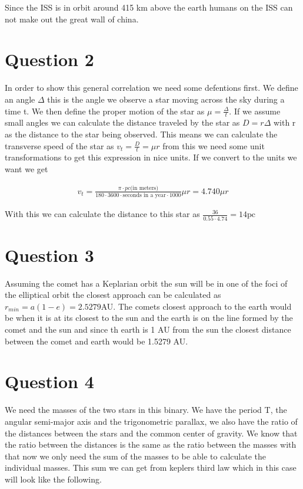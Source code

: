 \documentclass[a4paper]{article}
\begin{document}
Since the ISS is in orbit around 415 km above the earth humans on the ISS can not make out the great wall of china.

\section*{Question 2}

In order to show this general correlation we need some defentions first. We define an angle $\Delta$ this is the angle we observe a star moving across the sky during a time t. We then define the proper motion of the star as $\mu = \frac{\Delta}{t}$. If we assume small angles we can calculate the distance traveled by the star as $D = r\Delta$ with r as the distance to the star being observed. This means we can calculate the transverse speed of the star as $v_t = \frac{D}{t} = \mu r$ from this we need some unit transformations to get this expression in nice units. If we convert to the units we want we get

\begin{align}
    v_t = \frac{\pi \cdot pc\text{(in meters)}}{180\cdot3600\cdot\text{seconds in a year}\cdot1000} \mu r = 4.740 \mu r
\end{align}

With this we can calculate the distance to this star as $\frac{36}{0.55\cdot 4.74} = 14 \text{pc}$

\section*{Question 3}
 
Assuming the comet has a Keplarian orbit the sun will be in one of the foci of the elliptical orbit the closest approach can be calculated as $r_{min} = a(1-e) = 2.5279$AU. The comets closest approach to the earth would be when it is at its closest to the sun and the earth is on the line formed by the comet and the sun and since th earth is 1 AU from the sun the closest distance between the comet and earth would be 1.5279 AU. 

\section*{Question 4}

We need the masses of the two stars in this binary. We have the period T, the angular semi-major axis and the trigonometric parallax, we also have the ratio of the distances between the stars and the common center of gravity. We know that the ratio between the distances is the same as the ratio between the masses with that now we only need the sum of the masses to be able to calculate the individual masses. This sum we can get from keplers third law which in this case will look like the following.
\end{document}

